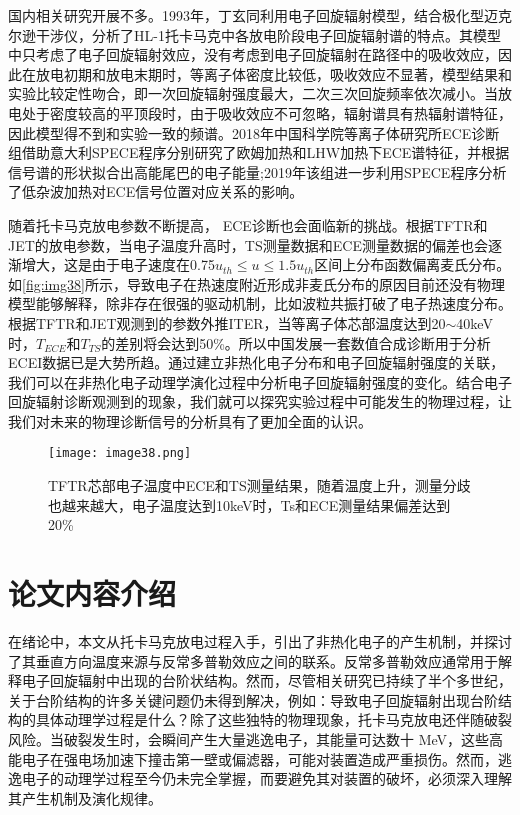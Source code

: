 \par 国内相关研究开展不多。1993年，丁玄同利用电子回旋辐射模型，结合极化型迈克尔逊干涉仪，分析了HL-1托卡马克中各放电阶段电子回旋辐射谱的特点\cite{RN1017}。其模型中只考虑了电子回旋辐射效应，没有考虑到电子回旋辐射在路径中的吸收效应，因此在放电初期和放电末期时，等离子体密度比较低，吸收效应不显著，模型结果和实验比较定性吻合，即一次回旋辐射强度最大，二次三次回旋频率依次减小。当放电处于密度较高的平顶段时，由于吸收效应不可忽略，辐射谱具有热辐射谱特征，因此模型得不到和实验一致的频谱。2018年中国科学院等离子体研究所ECE诊断组借助意大利SPECE程序分别研究了欧姆加热和LHW加热下ECE谱特征，并根据信号谱的形状拟合出高能尾巴的电子能量\cite{RN2115};2019年该组进一步利用SPECE程序分析了低杂波加热对ECE信号位置对应关系的影响\cite{RN1402}。

随着托卡马克放电参数不断提高， ECE诊断也会面临新的挑战。根据TFTR和JET的放电参数\cite{RN1019}，当电子温度升高时，TS测量数据和ECE测量数据的偏差也会逐渐增大，这是由于电子速度在0.75$u_{th}≤u≤1.5u_{th}$区间上分布函数偏离麦氏分布。如\autoref{fig:img38}所示，导致电子在热速度附近形成非麦氏分布的原因目前还没有物理模型能够解释，除非存在很强的驱动机制，比如波粒共振打破了电子热速度分布。根据TFTR和JET观测到的参数外推ITER，当等离子体芯部温度达到20$\sim$40keV时，$T_{ECE}$和$T_{TS}$的差别将会达到50\%。所以中国发展一套数值合成诊断用于分析ECEI数据已是大势所趋。通过建立非热化电子分布和电子回旋辐射强度的关联，我们可以在非热化电子动理学演化过程中分析电子回旋辐射强度的变化。结合电子回旋辐射诊断观测到的现象，我们就可以探究实验过程中可能发生的物理过程，让我们对未来的物理诊断信号的分析具有了更加全面的认识。
\begin{figure}[ht]
\centering
\texttt{[image: image38.png]}
\caption{\label{fig:img38}TFTR芯部电子温度中ECE和TS测量结果，随着温度上升，测量分歧也越来越大，电子温度达到10keV时，Ts和ECE测量结果偏差达到20\%}
\end{figure}
\section{论文内容介绍}
在绪论中，本文从托卡马克放电过程入手，引出了非热化电子的产生机制，并探讨了其垂直方向温度来源与反常多普勒效应之间的联系。反常多普勒效应通常用于解释电子回旋辐射中出现的台阶状结构。然而，尽管相关研究已持续了半个多世纪，关于台阶结构的许多关键问题仍未得到解决，例如：导致电子回旋辐射出现台阶结构的具体动理学过程是什么？除了这些独特的物理现象，托卡马克放电还伴随破裂风险。当破裂发生时，会瞬间产生大量逃逸电子，其能量可达数十 MeV，这些高能电子在强电场加速下撞击第一壁或偏滤器，可能对装置造成严重损伤。然而，逃逸电子的动理学过程至今仍未完全掌握，而要避免其对装置的破坏，必须深入理解其产生机制及演化规律。

